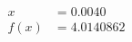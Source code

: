 \documentclass[preview]{standalone}
\begin{document}
\begin{align*}
x &= 0.0040\\f(x) &= 4.0140862
\end{align*}
\end{document}
